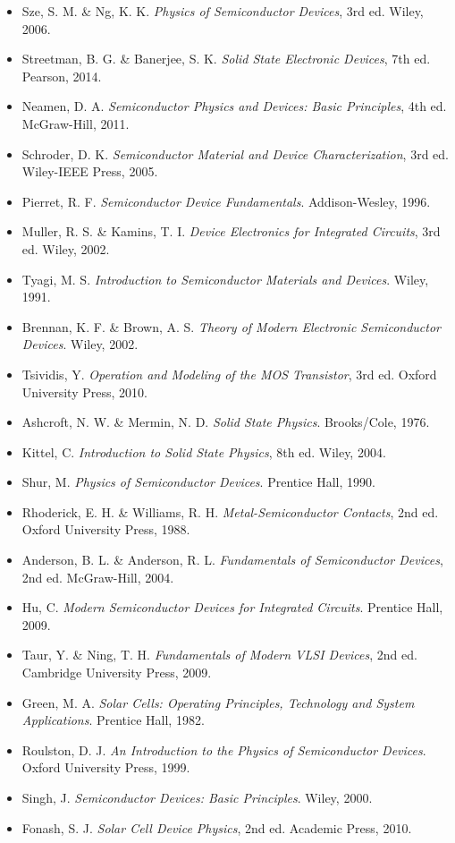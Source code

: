 \documentclass[a4paper, 11pt]{article}
\begin{document}
\begin{itemize}
\item Sze, S. M. \& Ng, K. K. \textit{Physics of Semiconductor Devices}, 3rd ed. Wiley, 2006.
\item Streetman, B. G. \& Banerjee, S. K. \textit{Solid State Electronic Devices}, 7th ed. Pearson, 2014.
\item Neamen, D. A. \textit{Semiconductor Physics and Devices: Basic Principles}, 4th ed. McGraw-Hill, 2011.
\item Schroder, D. K. \textit{Semiconductor Material and Device Characterization}, 3rd ed. Wiley-IEEE Press, 2005.
\item Pierret, R. F. \textit{Semiconductor Device Fundamentals}. Addison-Wesley, 1996.
\item Muller, R. S. \& Kamins, T. I. \textit{Device Electronics for Integrated Circuits}, 3rd ed. Wiley, 2002.
\item Tyagi, M. S. \textit{Introduction to Semiconductor Materials and Devices}. Wiley, 1991.
\item Brennan, K. F. \& Brown, A. S. \textit{Theory of Modern Electronic Semiconductor Devices}. Wiley, 2002.
\item Tsividis, Y. \textit{Operation and Modeling of the MOS Transistor}, 3rd ed. Oxford University Press, 2010.
\item Ashcroft, N. W. \& Mermin, N. D. \textit{Solid State Physics}. Brooks/Cole, 1976.
\item Kittel, C. \textit{Introduction to Solid State Physics}, 8th ed. Wiley, 2004.
\item Shur, M. \textit{Physics of Semiconductor Devices}. Prentice Hall, 1990.
\item Rhoderick, E. H. \& Williams, R. H. \textit{Metal-Semiconductor Contacts}, 2nd ed. Oxford University Press, 1988.
\item Anderson, B. L. \& Anderson, R. L. \textit{Fundamentals of Semiconductor Devices}, 2nd ed. McGraw-Hill, 2004.
\item Hu, C. \textit{Modern Semiconductor Devices for Integrated Circuits}. Prentice Hall, 2009.
\item Taur, Y. \& Ning, T. H. \textit{Fundamentals of Modern VLSI Devices}, 2nd ed. Cambridge University Press, 2009.
\item Green, M. A. \textit{Solar Cells: Operating Principles, Technology and System Applications}. Prentice Hall, 1982.
\item Roulston, D. J. \textit{An Introduction to the Physics of Semiconductor Devices}. Oxford University Press, 1999.
\item Singh, J. \textit{Semiconductor Devices: Basic Principles}. Wiley, 2000.
\item Fonash, S. J. \textit{Solar Cell Device Physics}, 2nd ed. Academic Press, 2010.
\end{itemize}
\end{document}
